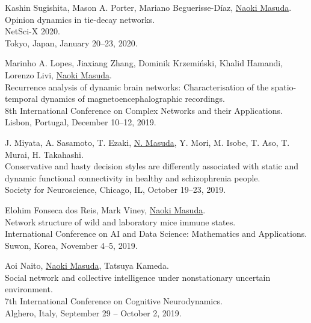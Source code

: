 \documentclass[11pt,letter]{article}
\begin{document}
\begin{etaremune}
\item Kashin Sugishita, Mason A. Porter, Mariano Beguerisse-D\'{i}az, \underline{Naoki Masuda}.
Opinion dynamics in tie-decay networks.\\
NetSci-X 2020.\\
Tokyo, Japan, January 20--23, 2020.

\item Marinho A. Lopes, Jiaxiang Zhang, Dominik Krzemi\'{n}ski, Khalid Hamandi, Lorenzo Livi, \underline{Naoki Masuda}.\\
Recurrence analysis of dynamic brain networks: Characterisation of the spatio-temporal dynamics of magnetoencephalographic recordings.\\
8th International Conference on Complex Networks and their Applications.\\
Lisbon, Portugal, December 10--12, 2019.

\item J. Miyata, A. Sasamoto, T. Ezaki, \underline{N. Masuda}, Y. Mori, M. Isobe, T. Aso, T. Murai, H. Takahashi.\\
Conservative and hasty decision styles are differently associated with static and dynamic functional connectivity in healthy and schizophrenia people.\\
Society for Neuroscience, Chicago, IL, October 19--23, 2019.

\item Elohim Fonseca dos Reis, Mark Viney, \underline{Naoki Masuda}.\\
Network structure of wild and laboratory mice immune states.\\
International Conference on AI and Data Science: Mathematics and Applications.\\
Suwon, Korea, November 4--5, 2019.

\item Aoi Naito, \underline{Naoki Masuda}, Tatsuya Kameda.\\
Social network and collective intelligence under nonstationary uncertain environment.\\
7th International Conference on Cognitive Neurodynamics.\\
Alghero, Italy, September 29 -- October 2, 2019.


\end{etaremune}
\end{document}

